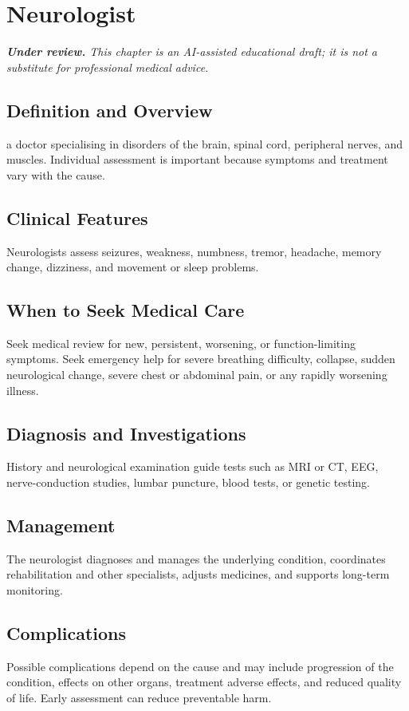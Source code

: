 \chapter{Neurologist}

\medskip
\noindent\textit{\textbf{Under review.} This chapter is an AI-assisted educational draft; it is not a substitute for professional medical advice.}

\section*{Definition and Overview}
a doctor specialising in disorders of the brain, spinal cord, peripheral nerves, and muscles. Individual assessment is important because symptoms and treatment vary with the cause.

\section*{Clinical Features}
Neurologists assess seizures, weakness, numbness, tremor, headache, memory change, dizziness, and movement or sleep problems.

\section*{When to Seek Medical Care}
Seek medical review for new, persistent, worsening, or function-limiting symptoms. Seek emergency help for severe breathing difficulty, collapse, sudden neurological change, severe chest or abdominal pain, or any rapidly worsening illness.

\section*{Diagnosis and Investigations}
History and neurological examination guide tests such as MRI or CT, EEG, nerve-conduction studies, lumbar puncture, blood tests, or genetic testing.

\section*{Management}
The neurologist diagnoses and manages the underlying condition, coordinates rehabilitation and other specialists, adjusts medicines, and supports long-term monitoring.

\section*{Complications}
Possible complications depend on the cause and may include progression of the condition, effects on other organs, treatment adverse effects, and reduced quality of life. Early assessment can reduce preventable harm.

